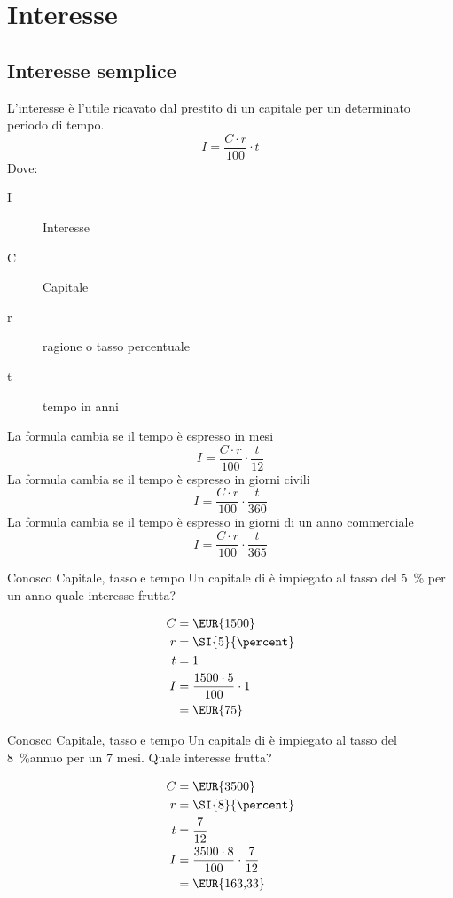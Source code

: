 \chapter{Interesse}
\section{Interesse semplice}
L'interesse è l'utile ricavato dal prestito di un capitale per un determinato periodo di tempo.
\[I=\dfrac{C\cdot r}{100}\cdot t\]
Dove:\begin{description}
	\item[I] Interesse
	\item[C] Capitale
	\item[r] ragione o tasso percentuale
	\item[t] tempo in anni
\end{description}
La formula cambia se il tempo è espresso in mesi
\[I=\dfrac{C\cdot r}{100}\cdot \dfrac{t}{12}\]
La formula cambia se il tempo è espresso in giorni civili
\[I=\dfrac{C\cdot r}{100}\cdot \dfrac{t}{360}\]
La formula cambia se il tempo è espresso in giorni di un anno commerciale
\[I=\dfrac{C\cdot r}{100}\cdot \dfrac{t}{365}\]
	\begin{esempiot}{Conosco Capitale, tasso e tempo}{}
Un capitale di  è impiegato al tasso del \SI{5}{\percent} per un anno quale interesse frutta?
\end{esempiot}
\begin{align*}
	C={}&\mbox{\EUR{1500}}\\
	r={}&\SI{5}{\percent} \\
	t={}&1\\
	I={}&\dfrac{1500\cdot 5}{100}\cdot 1\\
	={}&\mbox{\EUR{75}}\\
\end{align*}
	\begin{esempiot}{Conosco Capitale, tasso e tempo}{}
	Un capitale di  è impiegato al tasso del \SI{8}{\percent}annuo  per un 7 mesi. Quale interesse frutta?
\end{esempiot}
\begin{align*}
	C={}&\mbox{\EUR{3500}}\\
	r={}&\SI{8}{\percent} \\
	t={}&\dfrac{7}{12}\\
	I={}&\dfrac{3500\cdot 8}{100}\cdot \dfrac{7}{12}\\
	={}&\mbox{\EUR{163,33}}\\
\end{align*}

